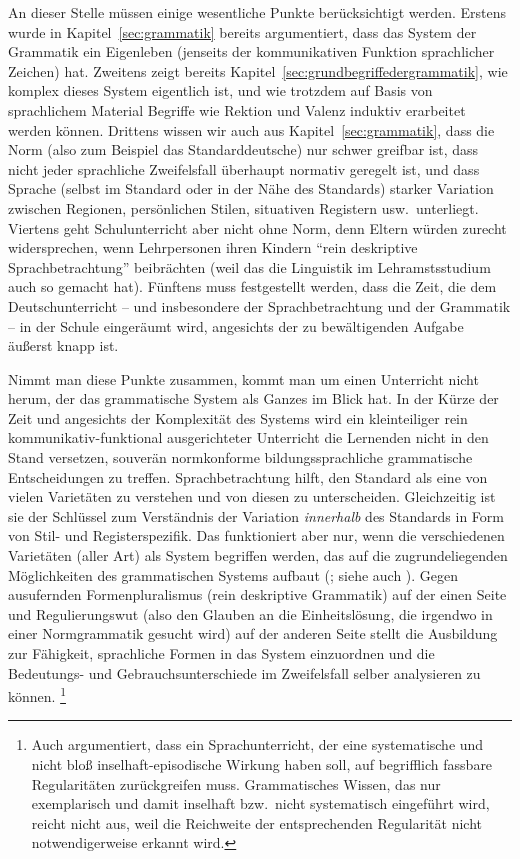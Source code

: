 An dieser Stelle müssen einige wesentliche Punkte berücksichtigt werden.
Erstens wurde in Kapitel~\ref{sec:grammatik} bereits argumentiert, dass das System der Grammatik ein Eigenleben (jenseits der kommunikativen Funktion sprachlicher Zeichen) hat.
Zweitens zeigt bereits Kapitel~\ref{sec:grundbegriffedergrammatik}, wie komplex dieses System eigentlich ist, und wie trotzdem auf Basis von sprachlichem Material Begriffe wie Rektion und Valenz induktiv erarbeitet werden können.
Drittens wissen wir auch aus Kapitel~\ref{sec:grammatik}, dass die Norm (also zum Beispiel das Standarddeutsche) nur schwer greifbar ist, dass nicht jeder sprachliche Zweifelsfall überhaupt normativ geregelt ist, und dass Sprache (selbst im Standard oder in der Nähe des Standards) starker Variation zwischen Regionen, persönlichen Stilen, situativen Registern usw.\ unterliegt.
Viertens geht Schulunterricht aber nicht ohne Norm, denn Eltern würden zurecht widersprechen, wenn Lehrpersonen ihren Kindern "`rein deskriptive Sprachbetrachtung"' beibrächten (weil das die Linguistik im Lehramstsstudium auch so gemacht hat).
Fünftens muss festgestellt werden, dass die Zeit, die dem Deutschunterricht -- und insbesondere der Sprachbetrachtung und der Grammatik -- in der Schule eingeräumt wird, angesichts der zu bewältigenden Aufgabe äußerst knapp ist.

Nimmt man diese Punkte zusammen, kommt man um einen Unterricht nicht herum, der das grammatische System als Ganzes im Blick hat.
In der Kürze der Zeit und angesichts der Komplexität des Systems wird ein kleinteiliger rein kommunikativ-funktional ausgerichteter Unterricht die Lernenden nicht in den Stand versetzen, souverän normkonforme bildungssprachliche grammatische Entscheidungen zu treffen.
Sprachbetrachtung hilft, den Standard als eine von vielen Varietäten zu verstehen und von diesen zu unterscheiden.
Gleichzeitig ist sie der Schlüssel zum Verständnis der Variation \textit{innerhalb} des Standards in Form von Stil- und Registerspezifik.
Das funktioniert aber nur, wenn die verschiedenen Varietäten (aller Art) als System begriffen werden, das auf die zugrundeliegenden Möglichkeiten des grammatischen Systems aufbaut (\citealt[10--11]{Eisenberg2004}; siehe auch \citealt[10]{Menzel2017}).
Gegen ausufernden Formenpluralismus (rein deskriptive Grammatik) auf der einen Seite und Regulierungswut (also den Glauben an die Einheitslösung, die irgendwo in einer Normgrammatik gesucht wird) auf der anderen Seite stellt \citet[8--9]{Eisenberg2004} die Ausbildung zur Fähigkeit, sprachliche Formen in das System einzuordnen und die Bedeutungs- und Gebrauchsunterschiede im Zweifelsfall selber analysieren zu können.%
\footnote{Auch \citet[80--83]{Portmanntselikas2011} argumentiert, dass ein Sprachunterricht, der eine systematische und nicht bloß inselhaft-episodische Wirkung haben soll, auf begrifflich fassbare Regularitäten zurückgreifen muss.
Grammatisches Wissen, das nur exemplarisch und damit inselhaft bzw.\ nicht systematisch eingeführt wird, reicht nicht aus, weil die Reichweite der entsprechenden Regularität nicht notwendigerweise erkannt wird.}

